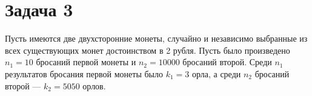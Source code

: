 \documentclass[12pt, twoside]{article}
\begin{document}
\section{Задача 3}
Пусть имеются две двухсторонние монеты, случайно и независимо выбранные из всех существующих монет достоинством в 2 рубля. Пусть было произведено $n_1 = 10$ бросаний первой монеты и $n_2 = 10000$ бросаний второй. Среди $n_1$ результатов бросания первой монеты было $k_1=3$ орла, а среди $n_2$ бросаний  второй --- $k_2=5050$ орлов.




\end{document}
